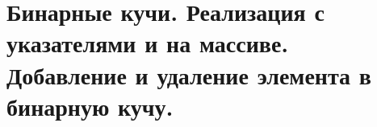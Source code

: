 \section{Бинарные кучи. Реализация с указателями и на массиве. Добавление и удаление элемента в бинарную кучу. }